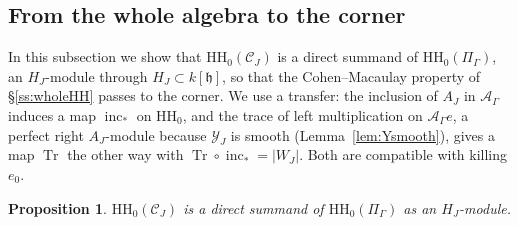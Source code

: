 \documentclass[11pt]{amsart}
\numberwithin{table}{section}
\numberwithin{figure}{section}
\numberwithin{equation}{section}
\newtheorem{prop}[thm]{Proposition}
\theoremstyle{definition}
\theoremstyle{plain}
\newcommand{\cC}{\mathcal{C}}
\newcommand{\cA}{\mathcal{A}}
\newcommand{\cY}{\mathcal{Y}}
\newcommand{\h}{\mathfrak{h}}
\newcommand{\HH}{\mathrm{HH}}
\begin{document}
\subsection{From the whole algebra to the corner}\label{ss:transfer}

In this subsection we show that $\HH_0(\cC_J)$ is a direct summand of $\HH_0(\Pi_\Gamma)$, an $H_J$-module through $H_J \subset k[\h]$, so that the Cohen--Macaulay property of \S\ref{ss:wholeHH} passes to the corner. We use a transfer: the inclusion of $A_J$ in $\cA_\Gamma$ induces a map $\operatorname{inc}_*$ on $\HH_0$, and the trace of left multiplication on $\cA_\Gamma e$, a perfect right $A_J$-module because $\cY_J$ is smooth (Lemma~\ref{lem:Ysmooth}), gives a map $\operatorname{Tr}$ the other way with $\operatorname{Tr} \circ \operatorname{inc}_* = |W_J|$. Both are compatible with killing $e_0$.

\begin{prop}\label{prop:transfer}
$\HH_0(\cC_J)$ is a direct summand of $\HH_0(\Pi_\Gamma)$ as an $H_J$-module.
\end{prop}
\end{document}
